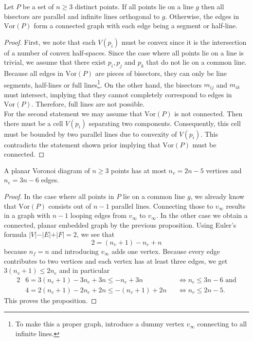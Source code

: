     \begin{proposition} 
        Let $P$ be a set of $n \geq 3$ distinct points. If all points lie on a line $g$ then all bisectors are parallel and infinite lines orthogonal to $g$. Otherwise, the edges in $\text{Vor}(P)$ form a connected graph with each edge being a segment or half-line. 
    \end{proposition}
    \begin{proof} 
        First, we note that each $V(p_i)$ must be convex since it is the intersection of a number of convex half-spaces. Since the case where all points lie on a line is trivial, we assume that there exist $p_i, p_j$ and $p_k$ that do not lie on a common line. Because all edges in $\text{Vor}(P)$ are pieces of bisectors, they can only be line segments, half-lines or full lines\footnote{To make this a proper graph, introduce a dummy vertex $v_\infty$ connecting to all infinite lines.}. On the other hand, the bisectors $m_{ij}$ and $m_{ik}$ must intersect, implying that they cannot completely correspond to edges in $\text{Vor}(P)$. Therefore, full lines are not possible. \\
        For the second statement we may assume that $\text{Vor}(P)$ is not connected. Then there must be a cell $V(p_i)$ separating two components. Consequently, this cell must be bounded by two parallel lines due to convexity of $V(p_i)$. This contradicts the statement shown prior implying that $\text{Vor}(P)$ must be connected.
    \end{proof}

    \begin{lemma}
        A planar Voronoi diagram of $n \geq 3$ points has at most $n_v = 2n - 5$ vertices and $n_e = 3n - 6$ edges. 
    \end{lemma}
    \begin{proof} 
        In the case where all points in $P$ lie on a common line $g$, we already know that $\text{Vor}(P)$ consists out of $n-1$ parallel lines. Connecting those to $v_\infty$ results in a graph with $n-1$ looping edges from $v_\infty$ to $v_\infty$. In the other case we obtain a connected, planar embedded graph by the previous proposition. Using  Euler's formula $\vert V \vert - \vert E \vert + \vert F \vert = 2$, we see that
        $$2 = (n_v + 1) - n_e + n$$
        because $n_f = n$ and introducing $v_\infty$ adds one vertex. Because every edge contributes to two vertices and each vertex has at least three edges, we get $3(n_v + 1) \leq 2n_e$ and in particular
        \begin{alignat*}{2}
            &6 = 3(n_v + 1) - 3n_e + 3n \leq -n_e + 3n &&\iff n_e \leq 3n - 6 \text{ and} \\
            &4 = 2(n_v + 1) - 2n_e + 2n \leq -(n_v + 1) + 2n &&\iff n_v \leq 2n - 5.
        \end{alignat*} 
        This proves the proposition. 
    \end{proof}


